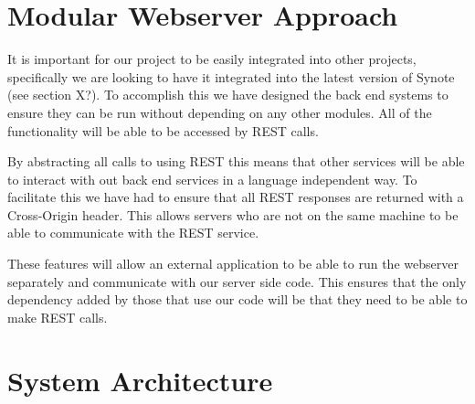 \section{Modular Webserver Approach}
\label{Section:Modular Approach}
It is important for our project to be easily integrated into other projects, specifically we are looking to have it integrated into the latest version of Synote (see section X?). To accomplish this we have designed the back end systems to ensure they can be run without depending on any other modules. All of the functionality will be able to be accessed by \gls{REST} calls.

By abstracting all calls to using \gls{REST} this means that other services will be able to interact with out back end services in a language independent way. To facilitate this we have had to ensure that all \gls{REST} responses are returned with a Cross-Origin header. This allows servers who are not on the same machine to be able to communicate with the \gls{REST} service.

These features will allow an external application to be able to run the webserver separately and communicate with our server side code. This ensures that the only dependency added by those that use our code will be that they need to be able to make \gls{REST} calls.

\section{System Architecture}



